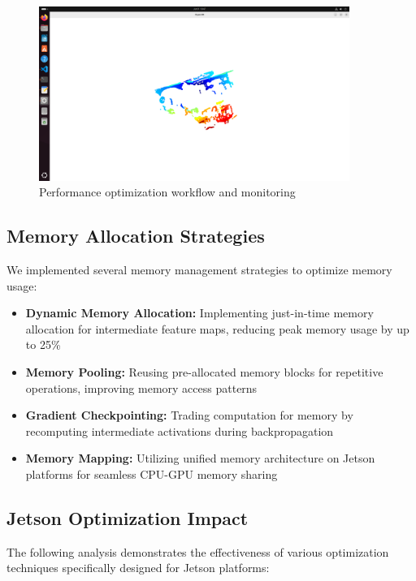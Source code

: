 \documentclass[12pt,a4paper]{report}
\begin{document}
\begin{figure}[htbp]
    \centering
    \includegraphics[width=0.9\textwidth]{figures/performance_optimisation.png}
    \caption{Performance optimization workflow and monitoring}
    \label{fig:performance_optimization}
\end{figure}

\subsection{Memory Allocation Strategies}

We implemented several memory management strategies to optimize memory usage:

\begin{itemize}
    \item \textbf{Dynamic Memory Allocation:} Implementing just-in-time memory allocation for intermediate feature maps, reducing peak memory usage by up to 25\%
    \item \textbf{Memory Pooling:} Reusing pre-allocated memory blocks for repetitive operations, improving memory access patterns
    \item \textbf{Gradient Checkpointing:} Trading computation for memory by recomputing intermediate activations during backpropagation
    \item \textbf{Memory Mapping:} Utilizing unified memory architecture on Jetson platforms for seamless CPU-GPU memory sharing
\end{itemize}

\subsection{Jetson Optimization Impact}

The following analysis demonstrates the effectiveness of various optimization techniques specifically designed for Jetson platforms:
\end{document}
